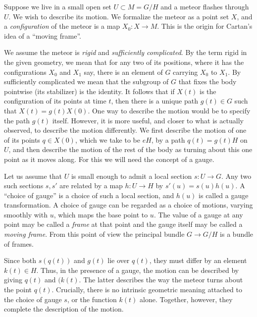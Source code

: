\begin{example}
    Suppose we live in a small open set $U\subset M=G\slash H$ and a meteor flashes through $U$. We wish to describe its motion. We formalize the meteor as a point set $X$, and a \emph{configuration} of the meteor is a map $X_0:X\to M$. This is the origin for Cartan's idea of a ``moving frame''.
    
    We assume the meteor is \emph{rigid} and \emph{sufficiently complicated}. By the term rigid in the given geometry, we mean that for any two of its positions, where it has the configurations $X_0$ and $X_1$ say, there is an element of $G$ carrying $X_0$ to $X_1$. By sufficiently complicated we mean that the subgroup of $G$ that fixes the body pointwise (its stabilizer) is the identity.  It follows that if $X(t)$ is the configuration of its points at time $t$, then there is a unique path $g(t)\in G$ such that $X(t)=g(t)X(0)$. One way to describe the motion would be to specify the path $g(t)$ itself. However, it is more useful, and closer to what is actually observed, to describe the motion differently. We first describe the motion of one of its points $q\in X(0)$, which we take to be $eH$, by a path $q(t)=g(t)H$ on $U$, and then describe the motion of the rest of the body as turning about this one point as it moves along. For this we will need the concept of a gauge.

    Let us assume that $U$ is small enough to admit a local section $s:U\to G$. Any two such sections $s,s'$ are related by a map $h:U\to H$ by $s'(u)=s(u)h(u)$. A ``choice of gauge'' is a choice of such a local section, and $h(u)$ is called a gauge transformation. A choice of gauge can be regarded as a choice of motions, varying smoothly with $u$, which maps the base point to $u$. The value of a gauge at any point may be called a \emph{frame} at that point and the gauge itself may be called a \emph{moving frame}. From this point of view the principal bundle $G\to G\slash H$ is a bundle of frames.

    Since both $s(q(t))$ and $g(t)$ lie over $q(t)$, they must differ by an element $k(t)\in H$. Thus, in the presence of a gauge, the motion can be described by giving $q(t)$ and $(k(t)$. The latter describes the way the meteor turns about the point $q(t)$. Crucially, there is no intrinsic geometric meaning attached to the choice of gauge $s$, or the function $k(t)$ alone. Together, however, they complete the description of the motion.
\end{example}


